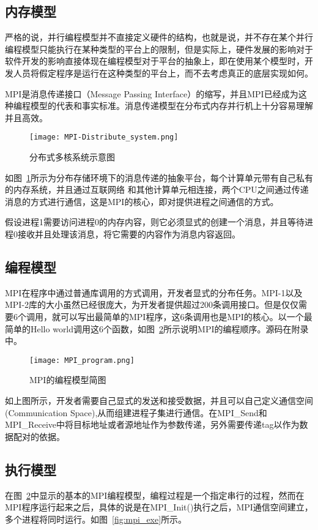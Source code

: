 \subsection{内存模型}
严格的说，并行编程模型并不直接定义硬件的结构，也就是说，并不存在某个并行编程模型只能执行在某种类型的平台上的限制，但是实际上，硬件发展的影响对于软件开发的影响直接体现在编程模型对于平台的抽象上，即在使用某个模型时，开发人员将假定程序是运行在这种类型的平台上，而不去考虑真正的底层实现如何。

MPI是消息传递接口（Message Passing Interface）的缩写，并且MPI已经成为这种编程模型的代表和事实标准。消息传递模型在分布式内存并行机上十分容易理解并且高效。
\begin{figure}
\centering
\texttt{[image: MPI-Distribute\_system.png]}
\caption{分布式多核系统示意图}\label{fig:dis_sys}
\end{figure}

如图~\ref{fig:dis_sys}所示为分布存储环境下的消息传递的抽象平台，每个计算单元带有自己私有的内存系统，并且通过互联网络
和其他计算单元相连接，两个CPU之间通过传递消息的方式进行通信，这是MPI的核心，即对提供进程之间通信的方式。

假设进程1需要访问进程0的内存内容，则它必须显式的创建一个消息，并且等待进程0接收并且处理该消息，将它需要的内容作为消息内容返回。
\subsection{编程模型}\label{sec:mpi_program}
MPI在程序中通过普通库调用的方式调用，开发者显式的分布任务。MPI-1以及MPI-2库的大小虽然已经很庞大，为开发者提供超过200条调用接口。但是仅仅需要6个调用，就可以写出最简单的MPI程序，这6条调用也是MPI的核心。以一个最简单的Hello world调用这6个函数，如图~\ref{fig:mpi_program}所示说明MPI的编程顺序。源码在附录中。
\begin{figure}
\centering
\texttt{[image: MPI\_program.png]}
\caption{MPI的编程模型简图}\label{fig:mpi_program}
\end{figure}
如上图所示，开发者需要自己显式的发送和接受数据，并且可以自己定义通信空间(Communication Space),从而组建进程子集进行通信。在MPI\_Send和MPI\_Receive中将目标地址或者源地址作为参数传递，另外需要传递tag以作为数据配对的依据。
\subsection{执行模型}

在图~\ref{fig:mpi_program}中显示的基本的MPI编程模型，编程过程是一个指定串行的过程，然而在MPI程序运行起来之后，具体的说是在MPI\_Init()执行之后，MPI通信空间建立，多个进程将同时运行。如图~\ref{fig:mpi_exe}所示。

